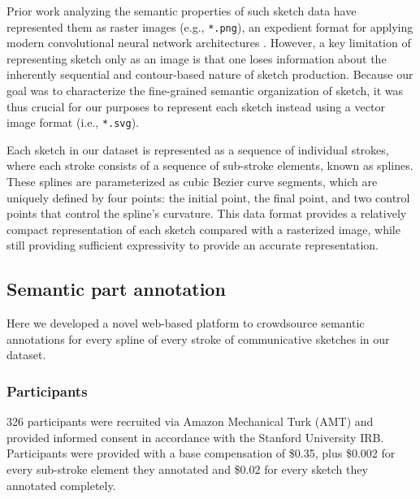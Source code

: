 \documentclass[10pt,letterpaper]{article}
\begin{document}
Prior work analyzing the semantic properties of such sketch data have represented them as raster images (e.g., \texttt{*.png}), an expedient format for applying modern convolutional neural network architectures \cite{FanCommon2018,sangkloy2016sketchy,yu2017sketch}. 
However, a key limitation of representing sketch only as an image is that one loses information about the inherently sequential and contour-based nature of sketch production. 
Because our goal was to characterize the fine-grained semantic organization of sketch, it was thus crucial for our purposes to represent each sketch instead using a vector image format (i.e., \texttt{*.svg}). 

Each sketch in our dataset is represented as a sequence of individual strokes, where each stroke consists of a sequence of sub-stroke elements, known as splines. 
These splines are parameterized as cubic Bezier curve segments, which are uniquely defined by four points: the initial point, the final point, and two control points that control the spline's curvature.
This data format provides a relatively compact representation of each sketch compared with a rasterized image, while still providing sufficient expressivity to provide an accurate representation. 

\subsection{Semantic part annotation}

Here we developed a novel web-based platform to crowdsource semantic annotations for every spline of every stroke of communicative sketches in our dataset. 

\subsubsection{Participants}
326 participants were recruited via Amazon Mechanical Turk (AMT) and provided informed consent in accordance with the Stanford University IRB. 
Participants were provided with a base compensation of \$0.35, plus \$0.002 for every sub-stroke element they annotated and \$0.02 for every sketch they annotated completely. 
\end{document}

